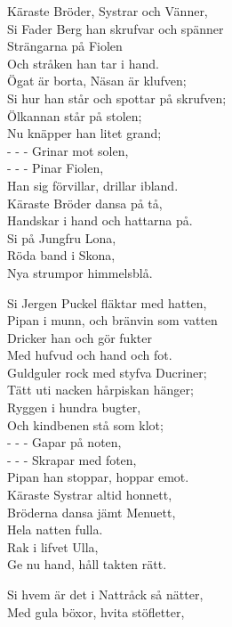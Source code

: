 \vspace{10pt}
Käraste Bröder, Systrar och Vänner,\\
Si Fader Berg han skrufvar och spänner\\
Strängarna på Fiolen\\
Och stråken han tar i hand.\\
Ögat är borta, Näsan är klufven;\\
Si hur han står och spottar på skrufven;\\
Ölkannan står på stolen;\\
Nu knäpper han litet grand;\\
-  -  -  Grinar mot solen,\\
-  -  -  Pinar Fiolen,\\
Han sig förvillar, drillar ibland.\\
Käraste Bröder dansa på tå,\\
Handskar i hand och hattarna på.\\
Si på Jungfru Lona,\\
Röda band i Skona,\\
Nya strumpor himmelsblå.\par
\vspace{10pt}
Si Jergen Puckel fläktar med hatten,\\
Pipan i munn, och bränvin som vatten\\
Dricker han och gör fukter\\
Med hufvud och hand och fot.\\
Guldguler rock med styfva Ducriner;\\
Tätt uti nacken hårpiskan hänger;\\
Ryggen i hundra bugter,\\
Och kindbenen stå som klot;\\
-  -  -  Gapar på noten,\\
-  -  -  Skrapar med foten,\\
Pipan han stoppar, hoppar emot.\\
Käraste Systrar altid honnett,\\
Bröderna dansa jämt Menuett,\\
Hela natten fulla.\\
Rak i lifvet Ulla,\\
Ge nu hand, håll takten rätt.\par
\vspace{10pt}
Si hvem är det i Nattråck så nätter,\\
Med gula böxor, hvita stöfletter,\\
